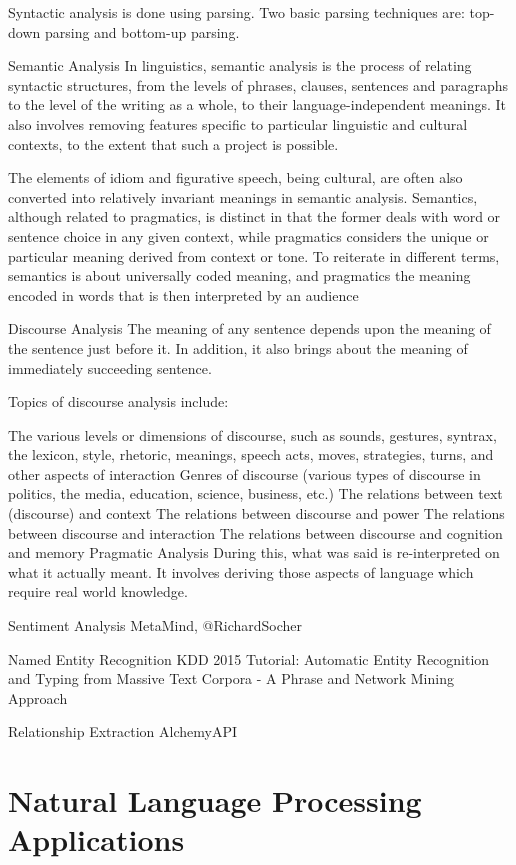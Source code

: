 Syntactic analysis is done using parsing. Two basic parsing techniques are: top-down parsing and bottom-up parsing.

Semantic Analysis
In linguistics, semantic analysis is the process of relating syntactic structures, from the levels of phrases, clauses, sentences and paragraphs to the level of the writing as a whole, to their language-independent meanings. It also involves removing features specific to particular linguistic and cultural contexts, to the extent that such a project is possible.

The elements of idiom and figurative speech, being cultural, are often also converted into relatively invariant meanings in semantic analysis. Semantics, although related to pragmatics, is distinct in that the former deals with word or sentence choice in any given context, while pragmatics considers the unique or particular meaning derived from context or tone. To reiterate in different terms, semantics is about universally coded meaning, and pragmatics the meaning encoded in words that is then interpreted by an audience

Discourse Analysis
The meaning of any sentence depends upon the meaning of the sentence just before it. In addition, it also brings about the meaning of immediately succeeding sentence.

Topics of discourse analysis include:

The various levels or dimensions of discourse, such as sounds, gestures, syntrax, the lexicon, style, rhetoric, meanings, speech acts, moves, strategies, turns, and other aspects of interaction
Genres of discourse (various types of discourse in politics, the media, education, science, business, etc.)
The relations between text (discourse) and context
The relations between discourse and power
The relations between discourse and interaction
The relations between discourse and cognition and memory
Pragmatic Analysis
During this, what was said is re-interpreted on what it actually meant. It involves deriving those aspects of language which require real world knowledge.

Sentiment Analysis
MetaMind, @RichardSocher

Named Entity Recognition
KDD 2015 Tutorial: Automatic Entity Recognition and Typing from Massive Text Corpora - A Phrase and Network Mining Approach

Relationship Extraction
AlchemyAPI

\section{Natural Language Processing Applications}

